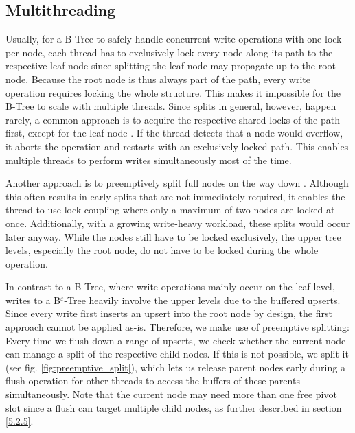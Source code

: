 \subsection{Multithreading}

Usually, for a B-Tree to safely handle concurrent write operations with one lock per node, each thread has to exclusively lock every node along its path to the respective leaf node since splitting the leaf node may propagate up to the root node. Because the root node is thus always part of the path, every write operation requires locking the whole structure. This makes it impossible for the B-Tree to scale with multiple threads.\newline
Since splits in general, however, happen rarely, a common approach is to acquire the respective shared locks of the path first, except for the leaf node \cite{b_tree_locking}. If the thread detects that a node would overflow, it aborts the operation and restarts with an exclusively locked path. This enables multiple threads to perform writes simultaneously most of the time.

Another approach is to preemptively split full nodes on the way down \cite{b_tree_locking}. Although this often results in early splits that are not immediately required, it enables the thread to use lock coupling where only a maximum of two nodes are locked at once. Additionally, with a growing write-heavy workload, these splits would occur later anyway. While the nodes still have to be locked exclusively, the upper tree levels, especially the root node, do not have to be locked during the whole operation.

In contrast to a B-Tree, where write operations mainly occur on the leaf level, writes to a B$^\varepsilon$-Tree heavily involve the upper levels due to the buffered upserts. Since every write first inserts an upsert into the root node by design, the first approach cannot be applied as-is.\newline
Therefore, we make use of preemptive splitting: Every time we flush down a range of upserts, we check whether the current node can manage a split of the respective child nodes. If this is not possible, we split it (see fig. \ref{fig:preemptive_split}), which lets us release parent nodes early during a flush operation for other threads to access the buffers of these parents simultaneously.\newline
Note that the current node may need more than one free pivot slot since a flush can target multiple child nodes, as further described in section \ref{5.2.5}.

